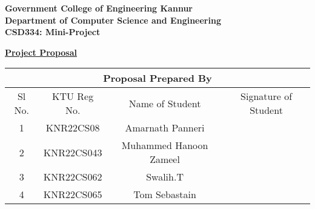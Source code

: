 \documentclass[14pt]{article}
\begin{document}
\begin{center}
\large{\textbf{Government College of Engineering Kannur\\}}
\large{\textbf{Department of Computer Science and Engineering\\}}
\large{\textbf{CSD334: Mini-Project\\}}
\end{center}

\begin{center}
\small{\textbf{\underline{ Project Proposal}\\}}
\end{center}

\begin{table}[ht!]
\begin{center}
\begin{tabular}{|cccc|}
\hline
\multicolumn{4}{|c|}{\textbf{Proposal Prepared By}}                        \\ \hline
\multicolumn{1}{|c|}{Sl No.} & \multicolumn{1}{c|}{KTU Reg No.} & \multicolumn{1}{c|}{Name of Student}              & Signature of Student \\ \hline
\multicolumn{1}{|c|}{1}      & \multicolumn{1}{c|}{KNR22CS08}   & \multicolumn{1}{c|}{Amarnath Panneri} &           \\ \hline
\multicolumn{1}{|c|}{2} & \multicolumn{1}{c|}{KNR22CS043} & \multicolumn{1}{c|}{Muhammed Hanoon Zameel} &  \\ \hline
\multicolumn{1}{|c|}{3} & \multicolumn{1}{c|}{KNR22CS062} & \multicolumn{1}{c|}{Swalih.T} &  \\ \hline
\multicolumn{1}{|c|}{4} & \multicolumn{1}{c|}{KNR22CS065} & \multicolumn{1}{c|}{Tom Sebastain} &  \\ \hline
\end{tabular}
\end{center}
\end{table}
\end{document}
